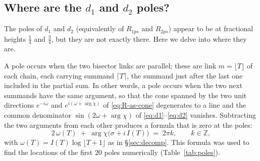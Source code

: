 \documentclass[11pt]{article}
\theoremstyle{definition}
\begin{document}
\subsection{Where are the \texorpdfstring{$d_1$}{d1} and \texorpdfstring{$d_2$}{d2} poles?}\label{sec:pole-locations}

The poles of $d_1$ and $d_2$ (equivalently of $R_{1ps}$ and $R_{2ps}$)
appear to be at fractional heights $\tfrac14$ and $\tfrac34$, but they
are not exactly there. Here we delve into where they are.

A pole occurs when the two bisector links are parallel; these are link
$m=\lfloor T\rfloor$ of each chain, each carrying summand $\lceil T\rceil$,
the summand just after the last one included in the partial sum. In other
words, a pole occurs when the two next summands have the same argument, so that the
cone spanned by the two unit directions $e^{-i\omega}$ and
$e^{i(\omega+\arg\chi)}$ of \eqref{eq:R-as-cone} degenerates to a line
and the common denominator $\sin(2\omega+\arg\chi)$ of
\eqref{eq:d1}--\eqref{eq:d2} vanishes. Subtracting the two arguments
from each other produces a formula that is zero at the poles:
\begin{equation}\label{eq:pole-locations}
2\,\omega(T) \;+\; \arg\chi\bigl(\sigma+i\,I(T)\bigr) \;=\; 2\pi k,
\qquad k\in\mathbb{Z},
\end{equation}
with $\omega(T)=I(T)\log\lfloor T+1\rfloor$ as in \S\ref{sec:decomp}.
This formula was used to find the locations of the first $20$ poles
numerically (Table~\ref{tab:poles}).
\end{document}
